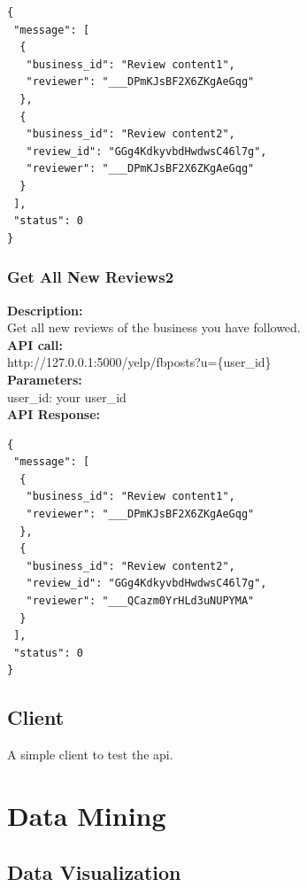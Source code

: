 \documentclass[12pt]{article}
\begin{document}
\begin{singlespacing}
\begin{lstlisting}
{
 "message": [
  {
   "business_id": "Review content1",
   "reviewer": "___DPmKJsBF2X6ZKgAeGqg"
  },
  {
   "business_id": "Review content2",
   "review_id": "GGg4KdkyvbdHwdwsC46l7g",
   "reviewer": "___DPmKJsBF2X6ZKgAeGqg"
  }
 ],
 "status": 0
}
\end{lstlisting}
\end{singlespacing}

\subsubsection{Get All New Reviews2}
\textbf{Description:}\\
Get all new reviews of the business you have followed.\\
\textbf{API call:}\\ 
http://127.0.0.1:5000/yelp/fbposts?u=\{user\_id\}\\
\textbf{Parameters:}\\
user\_id: your user\_id\\
\textbf{API Response:}

\begin{singlespacing}
\begin{lstlisting}
{
 "message": [
  {
   "business_id": "Review content1",
   "reviewer": "___DPmKJsBF2X6ZKgAeGqg"
  },
  {
   "business_id": "Review content2",
   "review_id": "GGg4KdkyvbdHwdwsC46l7g",
   "reviewer": "___QCazm0YrHLd3uNUPYMA"
  }
 ],
 "status": 0
}
\end{lstlisting}
\end{singlespacing}

\subsection{Client}
A simple client to test the api.

\section{Data Mining}\label{section-datamining}
\subsection{Data Visualization}
\end{document}
